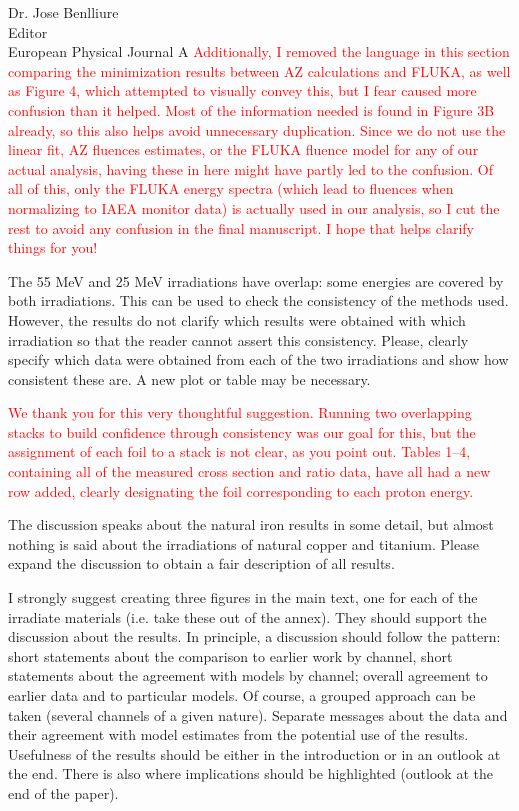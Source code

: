 \documentclass{letter} %
\newcommand{\colornote}[1]{\textcolor{red}{#1}}
\begin{document}
\begin{letter}{Dr. Jose Benlliure \\
Editor \\
European Physical Journal A}
\colornote{Additionally, I removed the language in this section comparing the minimization results between AZ calculations and FLUKA, as well as Figure 4, which attempted to visually convey this, but I fear caused more confusion than it helped.  Most of the information needed is found in Figure 3B already, so this also helps avoid unnecessary duplication. Since we do not use the linear fit, AZ fluences estimates, or the FLUKA fluence model for any of our actual analysis,  having these in here might have partly led to the confusion.  Of all of this, only the FLUKA energy spectra (which lead to fluences when normalizing to IAEA monitor data) is actually used in our analysis, so I cut the rest to avoid any confusion in the final manuscript.  I hope that helps clarify things for you!}


The 55 MeV and 25 MeV irradiations have overlap: some energies are covered by both irradiations. This can be used to check the consistency of the methods used. However, the results do not clarify which results were obtained with which irradiation so that the reader cannot assert this consistency. Please, clearly specify which data were obtained from each of the two irradiations and show how consistent these are. A new plot or table may be necessary.

\colornote{We thank you for this very thoughtful suggestion. Running two overlapping stacks to build confidence through consistency was our goal for this, but the assignment of each foil to a stack is not clear, as you point out.  Tables 1--4, containing all of the measured cross section and ratio data, have all had a new row added, clearly designating the foil corresponding to each proton energy.}

The discussion speaks about the natural iron results in some detail, but almost nothing is said about the irradiations of natural copper and titanium. Please expand the discussion to obtain a fair description of all results.

I strongly suggest creating three figures in the main text, one for each of the irradiate materials (i.e. take these out of the annex). They should support the discussion about the results. In principle, a discussion should follow the pattern: short statements about the comparison to earlier work by channel, short statements about the agreement with models by channel; overall agreement to earlier data and to particular models. Of course, a grouped approach can be taken (several channels of a given nature). Separate messages about the data and their agreement with model estimates from the potential use of the results. Usefulness of the results should be either in the introduction or in an outlook at the end. There is also where implications should be highlighted (outlook at the end of the paper).




\end{letter}
\end{document}

